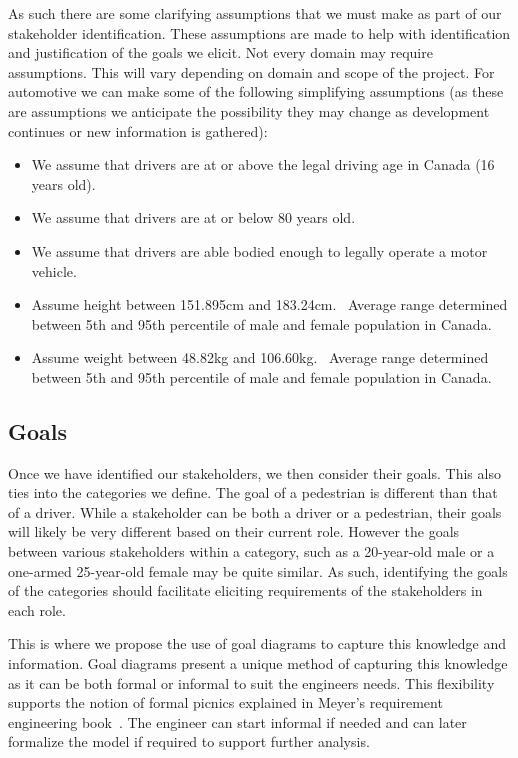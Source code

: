 As such there are some clarifying assumptions that we must make as part of our stakeholder identification. These assumptions are made to help with identification and justification of the goals we elicit. Not every domain may require assumptions. This will vary depending on domain and scope of the project. For automotive we can make some of the following simplifying assumptions (as these are assumptions we anticipate the possibility they may change as development continues or new information is gathered):
\begin{itemize}
	\item We assume that drivers are at or above the legal driving age in Canada (16 years old).
	\item We assume that drivers are at or below 80 years old.
	\item We assume that drivers are able bodied enough to legally operate a motor vehicle.
	\item Assume height between 151.895cm and 183.24cm.~\cite{AgeHeightStats} Average range determined between 5th and 95th percentile of male and female population in Canada.
	\item Assume weight between 48.82kg and 106.60kg.~\cite{AgeWeightStats} Average range determined between 5th and 95th percentile of male and female population in Canada.
\end{itemize}

\subsection{Goals}

Once we have identified our stakeholders, we then consider their goals. This also ties into the categories we define. The goal of a pedestrian is different than that of a driver. While a stakeholder can be both a driver or a pedestrian, their goals will likely be very different based on their current role. However the goals between various stakeholders within a category, such as a 20-year-old male or a one-armed 25-year-old female may be quite similar. As such, identifying the goals of the categories should facilitate eliciting requirements of the stakeholders in each role.

This is where we propose the use of goal diagrams to capture this knowledge and information. Goal diagrams present a unique method of capturing this knowledge as it can be both formal or informal to suit the engineers needs. This flexibility supports the notion of formal picnics explained in Meyer's requirement engineering book~\cite{meyer2022handbook}. The engineer can start informal if needed and can later formalize the model if required to support further analysis. 

